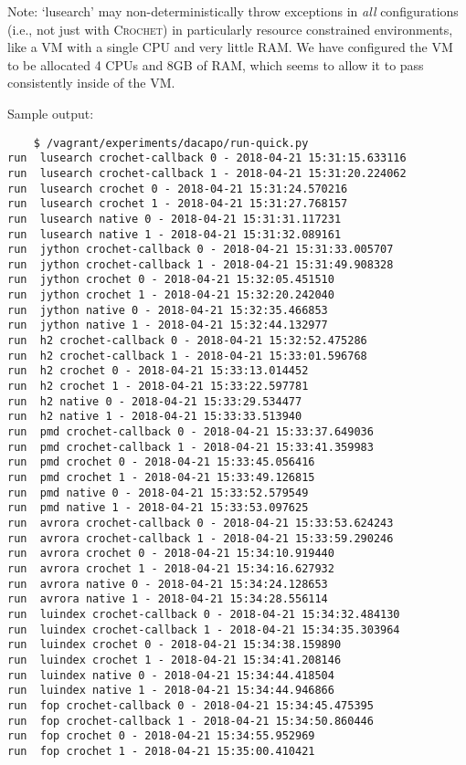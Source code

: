 \documentclass[12pt]{article}
\newcommand{\sysname}{\textsc{Crochet}\xspace}
\begin{document}
\begin{description}
        Note: `lusearch' may non-deterministically throw exceptions in \emph{all} configurations (i.e., not just with \sysname) in particularly resource constrained environments, like a VM with a single CPU and very little RAM. We have configured the VM to be allocated 4 CPUs and 8GB of RAM, which seems to allow it to pass consistently inside of the VM. 

Sample output:
\begin{verbatim}
	$ /vagrant/experiments/dacapo/run-quick.py 
run  lusearch crochet-callback 0 - 2018-04-21 15:31:15.633116
run  lusearch crochet-callback 1 - 2018-04-21 15:31:20.224062
run  lusearch crochet 0 - 2018-04-21 15:31:24.570216
run  lusearch crochet 1 - 2018-04-21 15:31:27.768157
run  lusearch native 0 - 2018-04-21 15:31:31.117231
run  lusearch native 1 - 2018-04-21 15:31:32.089161
run  jython crochet-callback 0 - 2018-04-21 15:31:33.005707
run  jython crochet-callback 1 - 2018-04-21 15:31:49.908328
run  jython crochet 0 - 2018-04-21 15:32:05.451510
run  jython crochet 1 - 2018-04-21 15:32:20.242040
run  jython native 0 - 2018-04-21 15:32:35.466853
run  jython native 1 - 2018-04-21 15:32:44.132977
run  h2 crochet-callback 0 - 2018-04-21 15:32:52.475286
run  h2 crochet-callback 1 - 2018-04-21 15:33:01.596768
run  h2 crochet 0 - 2018-04-21 15:33:13.014452
run  h2 crochet 1 - 2018-04-21 15:33:22.597781
run  h2 native 0 - 2018-04-21 15:33:29.534477
run  h2 native 1 - 2018-04-21 15:33:33.513940
run  pmd crochet-callback 0 - 2018-04-21 15:33:37.649036
run  pmd crochet-callback 1 - 2018-04-21 15:33:41.359983
run  pmd crochet 0 - 2018-04-21 15:33:45.056416
run  pmd crochet 1 - 2018-04-21 15:33:49.126815
run  pmd native 0 - 2018-04-21 15:33:52.579549
run  pmd native 1 - 2018-04-21 15:33:53.097625
run  avrora crochet-callback 0 - 2018-04-21 15:33:53.624243
run  avrora crochet-callback 1 - 2018-04-21 15:33:59.290246
run  avrora crochet 0 - 2018-04-21 15:34:10.919440
run  avrora crochet 1 - 2018-04-21 15:34:16.627932
run  avrora native 0 - 2018-04-21 15:34:24.128653
run  avrora native 1 - 2018-04-21 15:34:28.556114
run  luindex crochet-callback 0 - 2018-04-21 15:34:32.484130
run  luindex crochet-callback 1 - 2018-04-21 15:34:35.303964
run  luindex crochet 0 - 2018-04-21 15:34:38.159890
run  luindex crochet 1 - 2018-04-21 15:34:41.208146
run  luindex native 0 - 2018-04-21 15:34:44.418504
run  luindex native 1 - 2018-04-21 15:34:44.946866
run  fop crochet-callback 0 - 2018-04-21 15:34:45.475395
run  fop crochet-callback 1 - 2018-04-21 15:34:50.860446
run  fop crochet 0 - 2018-04-21 15:34:55.952969
run  fop crochet 1 - 2018-04-21 15:35:00.410421

\end{verbatim}
\end{description}
\end{document}
